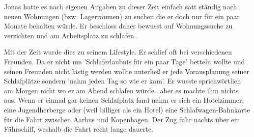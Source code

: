 Jonas hatte es nach eigenen Angaben zu dieser Zeit einfach satt ständig nach neuen Wohnungen (bzw. Lagerräumen) zu suchen die er doch nur für ein paar Monate behalten würde. Er beschloss daher bewusst auf Wohnungssuche zu verzichten und am Arbeitsplatz zu schlafen. 

Mit der Zeit wurde dies zu seinem Lifestyle. Er schlief oft bei verschiedenen Freunden. Da er nicht um 'Schlaferlaubnis für ein paar Tage' betteln wollte und seinen Freunden nicht lästig werden wollte unterließ er jede Vorausplanung seiner Schlafplätze sondern 'nahm jeden Tag so wie er kam'. Er wusste sprichwörtlich am Morgen nicht wo er am Abend schlafen würde...aber es machte ihm nichts aus. Wenn er einmal gar keinen Schlafplatz fand nahm er sich ein Hotelzimmer, eine Jugendherberge oder (weil billiger als ein Hotel) eine Schlafwagen-Bahnkarte für die Fahrt zwischen Aarhus und Kopenhagen. Der Zug fuhr nachts über ein Fährschiff, weshalb die Fahrt recht lange dauerte. 



